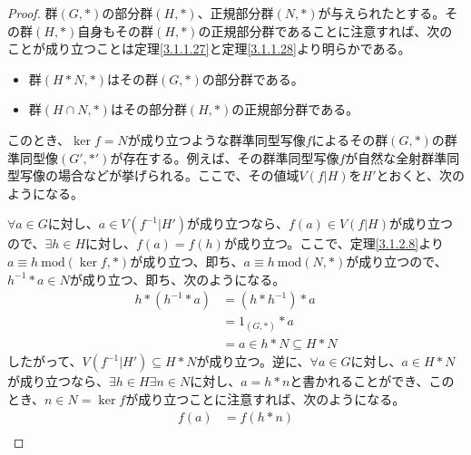 \documentclass[dvipdfmx]{jsarticle}
\begin{document}
\begin{proof}
群$(G,*)$の部分群$(H,*)$、正規部分群$(N,*)$が与えられたとする。その群$(H,*)$自身もその群$(H,*)$の正規部分群であることに注意すれば、次のことが成り立つことは定理\ref{3.1.1.27}と定理\ref{3.1.1.28}より明らかである。
\begin{itemize}
\item
  群$(H*N,*)$はその群$(G,*)$の部分群である。
\item
  群$(H \cap N,*)$はその部分群$(H,*)$の正規部分群である。
\end{itemize}\par
このとき、$\ker f = N$が成り立つような群準同型写像$f$によるその群$(G,*)$の群準同型像$\left( G',*' \right)$が存在する。例えば、その群準同型写像$f$が自然な全射群準同型写像の場合などが挙げられる。ここで、その値域$V\left( f|H \right)$を$H'$とおくと、次のようになる。
\begin{center}
\end{center}
$\forall a \in G$に対し、$a \in V\left( f^{- 1}|H' \right)$が成り立つなら、$f(a) \in V\left( f|H \right)$が成り立つので、$\exists h \in H$に対し、$f(a) = f(h)$が成り立つ。ここで、定理\ref{3.1.2.8}より$a \equiv h\ \mathrm{mod}\left( \ker f,* \right)$が成り立つ、即ち、$a \equiv h\ \mathrm{mod}(N,*)$が成り立つので、$h^{- 1}*a \in N$が成り立つ、即ち、次のようになる。
\begin{align*}
h*\left( h^{- 1}*a \right) &= \left( h*h^{- 1} \right)*a\\
&= 1_{(G,*)}*a\\
&= a \in h*N \subseteq H*N
\end{align*}
したがって、$V\left( f^{- 1}|H' \right) \subseteq H*N$が成り立つ。逆に、$\forall a \in G$に対し、$a \in H*N$が成り立つなら、$\exists h \in H\exists n \in N$に対し、$a = h*n$と書かれることができ、このとき、$n \in N = \ker f$が成り立つことに注意すれば、次のようになる。
\begin{align*}
f(a) &= f(h*n)\\

\end{align*}
\end{proof}
\end{document}
